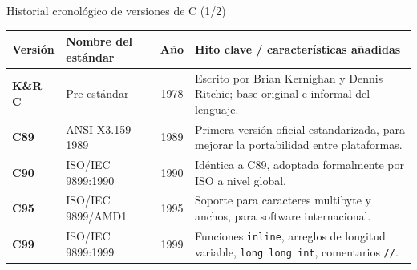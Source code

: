 \documentclass[aspectratio=169]{beamer}
\begin{document}
\begin{frame}{Historial cronológico de versiones de C (1/2)}
    \small
    \begin{table}
        \begin{tabularx}{\textwidth}{l p{2.8cm} c X}
            \toprule
            \textbf{Versión} & \textbf{Nombre del estándar} & \textbf{Año} & \textbf{Hito clave / características añadidas} \\
            \midrule
            \textbf{K\&R C} & Pre-estándar & 1978 & Escrito por Brian Kernighan y Dennis Ritchie; base original e informal del lenguaje. \\
            \addlinespace
            \textbf{C89} & ANSI X3.159-1989 & 1989 & Primera versión oficial estandarizada, para mejorar la portabilidad entre plataformas. \\
            \addlinespace
            \textbf{C90} & ISO/IEC 9899:1990 & 1990 & Idéntica a C89, adoptada formalmente por ISO a nivel global. \\
            \addlinespace
            \textbf{C95} & ISO/IEC 9899/AMD1 & 1995 & Soporte para caracteres multibyte y anchos, para software internacional. \\
            \addlinespace
            \textbf{C99} & ISO/IEC 9899:1999 & 1999 & Funciones \texttt{inline}, arreglos de longitud variable, \texttt{long long int}, comentarios \texttt{//}. \\
            \bottomrule
        \end{tabularx}
    \end{table}
\end{frame}
\end{document}
